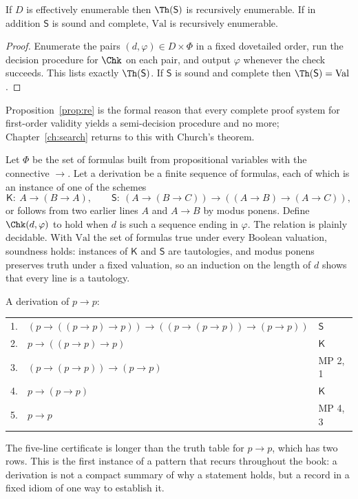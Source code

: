 \begin{proposition}
\label{prop:re}
If $D$ is effectively enumerable then $\Th(\mathsf{S})$ is recursively enumerable. If in addition $\mathsf{S}$ is sound and complete, $\mathrm{Val}$ is recursively enumerable.
\end{proposition}

\begin{proof}
Enumerate the pairs $(d,\varphi)\in D\times\Phi$ in a fixed dovetailed order, run the decision procedure for $\Chk$ on each pair, and output $\varphi$ whenever the check succeeds. This lists exactly $\Th(\mathsf{S})$. If $\mathsf{S}$ is sound and complete then $\Th(\mathsf{S})=\mathrm{Val}$.
\end{proof}

Proposition~\ref{prop:re} is the formal reason that every complete proof system for first-order validity yields a semi-decision procedure and no more; Chapter~\ref{ch:search} returns to this with Church's theorem.

\begin{example}
\label{ex:hilbert}
Let $\Phi$ be the set of formulas built from propositional variables with the connective $\to$. Let a derivation be a finite sequence of formulas, each of which is an instance of one of the schemes
\[
\textsf{K}:\ A\to(B\to A),
\qquad
\textsf{S}:\ (A\to(B\to C))\to((A\to B)\to(A\to C)),
\]
or follows from two earlier lines $A$ and $A\to B$ by modus ponens. Define $\Chk(d,\varphi)$ to hold when $d$ is such a sequence ending in $\varphi$. The relation is plainly decidable. With $\mathrm{Val}$ the set of formulas true under every Boolean valuation, soundness holds: instances of $\textsf{K}$ and $\textsf{S}$ are tautologies, and modus ponens preserves truth under a fixed valuation, so an induction on the length of $d$ shows that every line is a tautology.

A derivation of $p\to p$:
\begin{center}
\begin{tabular}{rll}
1. & $(p\to((p\to p)\to p))\to((p\to(p\to p))\to(p\to p))$ & $\textsf{S}$\\
2. & $p\to((p\to p)\to p)$ & $\textsf{K}$\\
3. & $(p\to(p\to p))\to(p\to p)$ & MP 2, 1\\
4. & $p\to(p\to p)$ & $\textsf{K}$\\
5. & $p\to p$ & MP 4, 3
\end{tabular}
\end{center}
The five-line certificate is longer than the truth table for $p\to p$, which has two rows. This is the first instance of a pattern that recurs throughout the book: a derivation is not a compact summary of why a statement holds, but a record in a fixed idiom of one way to establish it.
\end{example}

